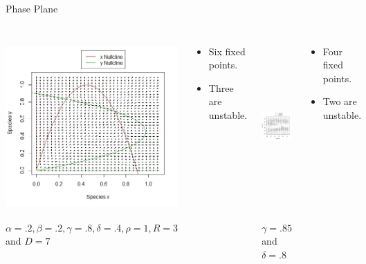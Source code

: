 \begin{frame}{Phase Plane}

  \vfill


  
  \begin{columns}
     {
      \includegraphics[height=7cm]{img/RplotMain}
      $\alpha = .2, \beta = .2,
      \gamma = .8, \delta = .4, \rho = 1, R = 3$ and $D = 7$ 

      \begin{itemize}
      \item Six fixed points.
      \item Three are unstable.
      \end{itemize}
    }

     {
      \includegraphics[height=7cm]{img/Rplot1} 
      $\gamma = .85$ and $\delta = .8$ 
      \begin{itemize}
      \item Four fixed points.
      \item Two are unstable.
      \end{itemize}
    }


\end{columns}
\end{frame}
